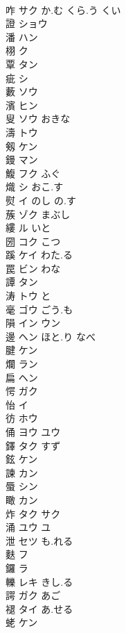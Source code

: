 \documentclass[8pt]{extreport}
\begin{document}
\begin{CJK}{UTF8}{min}
\\	咋	サク か.む くら.う くい			
\\	證	ショウ					
\\	潘	ハン			
\\	栩	ク			
\\	覃	タン			
\\	疵	シ			
\\	藪	ソウ			
\\	濱	ヒン					
\\	叟	ソウ おきな			
\\	濤	トウ			
\\	剱	ケン			
\\	鏝	マン			
\\	鰒	フク ふぐ			
\\	熾	シ おこ.す			
\\	熨	イ のし の.す			
\\	蔟	ゾク まぶし			
\\	縷	ル いと			
\\	圀	コク こつ			
\\	蹊	ケイ わた.る			
\\	罠	ビン わな			
\\	譚	タン			
\\	涛	トウ と			
\\	毫	ゴウ ごう.も			
\\	隕	イン ウン			
\\	邊	ヘン ほと.り なべ					
\\	腱	ケン			
\\	爛	ラン			
\\	扁	ヘン			
\\	愕	ガク			
\\	怡	イ			
\\	彷	ホウ			
\\	俑	ヨウ ユウ			
\\	鐸	タク すず			
\\	鉉	ケン			
\\	諫	カン			
\\	蜃	シン			
\\	瞰	カン			
\\	炸	タク サク			
\\	涌	ユウ ユ			
\\	泄	セツ も.れる			
\\	麩	フ			
\\	鑼	ラ			
\\	轢	レキ きし.る			
\\	諤	ガク あご			
\\	褪	タイ あ.せる			
\\	蛯	ケン			

\end{CJK}
\end{document}
